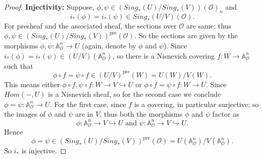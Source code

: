 \documentclass[10pt,a4paper]{amsart}
\begin{document}
\begin{proof}
\textbf{Injectivity:} Suppose, $\phi, \psi \in (Sing_*(U)/Sing_*(V))(\mathcal{O})_n$ and 
$$i_*(\phi) = i_*(\psi) \in Sing_*(U/V)(\mathcal{O}).$$ 
For presheaf and the associated sheaf, the sections over $\mathcal{O}$ are same; thus $\phi, \psi \in (Sing_*(U)/Sing_*(V))^{\text{pre}}(\mathcal{O})$. So the sections are given by the morphisms $\phi, \psi: \mathbb{A}^n_{\mathcal{O}} \to U$ (again, denote by $\phi$ and $\psi$). 
Since $i_*(\phi) = i_*(\psi) \in (U/V)(\mathbb{A}^n_{\mathcal{O}})$, so there is a Nisnevich covering $f: W \to \mathbb{A}^n_{\mathcal{O}}$ such that 
$$\phi \circ f = \psi \circ f \in (U/V)^{\text{pre}}(W) = U(W)/V(W).$$
This means either $\phi \circ f, \psi \circ f: W \to V \hookrightarrow U$ or $\phi \circ f = \psi \circ f: W \to U$.
Since $Hom(-, U)$ is a Nisnevich sheaf, so for the second case we conclude $\phi = \psi: \mathbb{A}^n_{\mathcal{O}} \to U$. For the first case, since $f$ is a covering, in particular surjective; so the images of $\phi$ and $\psi$ are in $V$, thus both the morphisms $\phi$ and $\psi$ factor as
$$\phi: \mathbb{A}^n_{\mathcal{O}} \to V \hookrightarrow U \text{ and } \psi: \mathbb{A}^n_{\mathcal{O}} \to V \hookrightarrow U.$$
Hence 
$$\phi = \psi \in (Sing_*(U)/Sing_*(V))^{\text{pre}}(\mathcal{O}) = U(\mathbb{A}^n_{\mathcal{O}})/V(\mathbb{A}^n_{\mathcal{O}}).$$
So $i_*$ is injective.


\end{proof}
\end{document}
